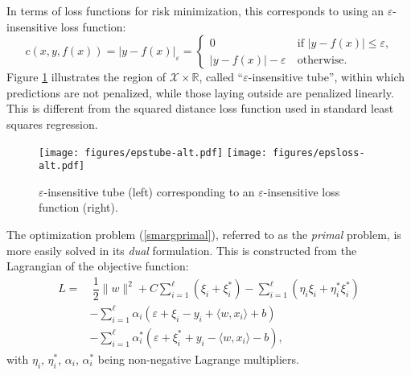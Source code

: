 \documentclass[12pt]{report}
\begin{document}
In terms of loss functions for risk minimization, this corresponds to using an $ \varepsilon $-insensitive loss function:
\begin{equation} \label{epsloss}
c(x,y,f(x)) = \vert y - f(x) \vert_{\varepsilon} = \begin{cases}
0 &\ \text{if } \vert y - f(x) \vert \leq \varepsilon \text{,}\\
\vert y - f(x) \vert - \varepsilon &\ \text{otherwise} \text{.}
\end{cases}
\end{equation}
Figure \ref{epstubefig} illustrates the region of $ \mathcal{X} \times \mathbb{R} $, called ``$ \varepsilon $-insensitive tube'', within which predictions are not penalized, while those laying outside are penalized linearly. This is different from the squared distance loss function used in standard least squares regression.

\begin{figure}[h]
  	\begin{adjustwidth}{-1in}{-1in}
  	\centering
  	\texttt{[image: figures/epstube-alt.pdf]}
  	\qquad
  	\texttt{[image: figures/epsloss-alt.pdf]}
  	\end{adjustwidth}
  \caption{$\varepsilon$-insensitive tube (left) corresponding to an $\varepsilon$-insensitive loss function (right).}
  \label{epstubefig}
\end{figure}

The optimization problem (\ref{smargprimal}), referred to as the \textit{primal} problem, is more easily solved in its \textit{dual} formulation. This is constructed from the Lagrangian of the objective function:
\begin{equation} \label{lagrangian}
\begin{split}
L =& \ \dfrac{1}{2}\| w \|^2 + C\sum_{i=1}^{\ell}(\xi_{i} + \xi_{i}^{*}) - \sum_{i=1}^{\ell}(\eta_{i}\xi_{i} + \eta_{i}^{*}\xi_{i}^{*}) \\
&- \sum_{i=1}^{\ell}\alpha_{i}(\varepsilon + \xi_{i} - y_{i} + \langle w,x_{i} \rangle + b) \\
&- \sum_{i=1}^{\ell}\alpha_{i}^{*}(\varepsilon + \xi_{i}^{*} + y_{i} - \langle w,x_{i} \rangle - b) \text{,}
\end{split}
\end{equation}
with $ \eta_{i} $, $ \eta_{i}^{*} $, $ \alpha_{i} $, $ \alpha_{i}^{*} $ being non-negative Lagrange multipliers.
\end{document}
